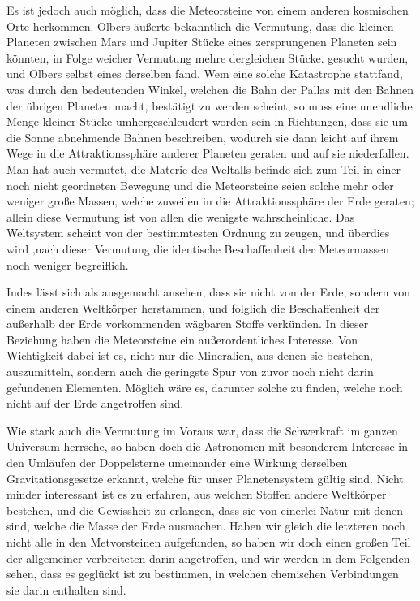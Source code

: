\documentclass[a4paper, 11pt, oneside]{article}
\begin{document}
Es ist jedoch auch möglich, dass die Meteorsteine von einem anderen kosmischen Orte herkommen. Olbers äußerte bekanntlich die Vermutung, dass die kleinen Planeten zwischen Mars und Jupiter Stücke eines zersprungenen Planeten sein könnten, in Folge weicher Vermutung mehre dergleichen Stücke. gesucht wurden, und Olbers selbst eines derselben fand. Wem eine solche Katastrophe stattfand, was durch den bedeutenden Winkel, welchen die Bahn der Pallas mit den Bahnen der übrigen Planeten macht, bestätigt zu werden scheint, so muss eine unendliche Menge kleiner Stücke umhergeschleudert worden sein in Richtungen, dass sie um die Sonne abnehmende Bahnen beschreiben, wodurch sie dann leicht auf ihrem Wege in die Attraktionssphäre anderer Planeten geraten und auf sie niederfallen. Man hat auch vermutet, die Materie des Weltalls befinde sich zum Teil in einer noch nicht geordneten Bewegung und die Meteorsteine seien solche mehr oder weniger große Massen‚ welche zuweilen in die Attraktionssphäre der Erde geraten; allein diese Vermutung ist von allen die wenigste wahrscheinliche. Das Weltsystem scheint von der bestimmtesten Ordnung zu zeugen, und überdies wird ‚nach dieser Vermutung die identische Beschaffenheit der Meteormassen noch weniger begreiflich.

Indes lässt sich als ausgemacht ansehen, dass sie nicht von der Erde, sondern von einem anderen Weltkörper herstammen, und folglich die Beschaffenheit der außerhalb der Erde vorkommenden wägbaren Stoffe verkünden. In dieser Beziehung haben die Meteorsteine ein außerordentliches Interesse. Von Wichtigkeit dabei ist es, nicht nur die Mineralien, aus denen sie bestehen, auszumitteln, sondern auch die geringste Spur von zuvor noch nicht darin gefundenen Elementen. Möglich wäre es, darunter solche zu finden, welche noch nicht auf der Erde angetroffen sind.

Wie stark auch die Vermutung im Voraus war, dass die Schwerkraft im ganzen Universum herrsche, so haben doch die Astronomen mit besonderem Interesse in den Umläufen der Doppelsterne umeinander eine Wirkung derselben Gravitationsgesetze erkannt, welche für unser Planetensystem gültig sind. Nicht minder interessant ist es zu erfahren, aus welchen Stoffen andere Weltkörper bestehen, und die Gewissheit zu erlangen, dass sie von einerlei Natur mit denen sind, welche die Masse der Erde ausmachen. Haben wir gleich die letzteren noch nicht alle in den Metvorsteinen aufgefunden, so haben wir doch einen großen Teil der allgemeiner verbreiteten darin angetroffen, und wir werden in dem Folgenden sehen, dass es geglückt ist zu bestimmen, in welchen chemischen Verbindungen sie darin enthalten sind.
\end{document}
